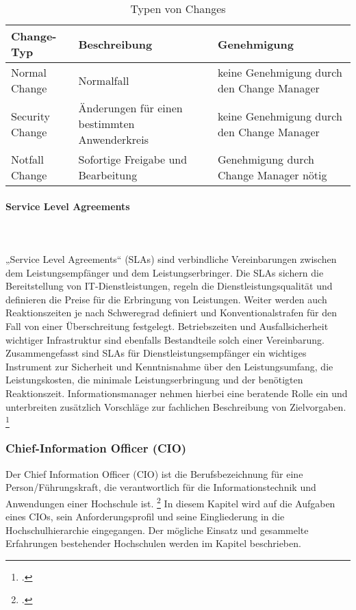 \begin{table}[h!]
	\begin{tabularx}{\textwidth}{|X|X|X|}
		\hline \textbf{Change-Typ} & \textbf{Beschreibung} & \textbf{Genehmigung}\\
		\hline Normal Change & Normalfall & keine Genehmigung durch den Change Manager\\ 
		\hline Security Change & Änderungen für einen bestimmten Anwenderkreis & keine Genehmigung 			durch den Change Manager\\
		\hline Notfall Change & Sofortige Freigabe und Bearbeitung & Genehmigung durch Change 				Manager nötig\\
		\hline
	\end{tabularx}
	\caption{Typen von Changes\protect \footnotemark}
	\label{tab_typen_von_changes}
\end{table}

\paragraph{Service Level Agreements}\mbox{}\\\\
„Service Level Agreements“ (SLAs) sind verbindliche Vereinbarungen zwischen dem Leistungsempfänger 
und dem Leistungserbringer. Die SLAs sichern die Bereitstellung von IT-Dienstleistungen, regeln die 
Dienstleistungsqualität und definieren die Preise für die Erbringung von Leistungen. Weiter werden auch 
Reaktionszeiten je nach Schweregrad definiert und Konventionalstrafen für den Fall von einer 
Überschreitung festgelegt. Betriebszeiten und Ausfallsicherheit wichtiger Infrastruktur sind ebenfalls 
Bestandteile solch einer Vereinbarung.
Zusammengefasst sind SLAs für Dienstleistungsempfänger ein wichtiges Instrument zur Sicherheit und 
Kenntnisnahme über den Leistungsumfang, die Leistungskosten, die minimale Leistungserbringung 
und der benötigten Reaktionszeit. Informationsmanager nehmen hierbei eine beratende Rolle ein und 
unterbreiten zusätzlich Vorschläge zur fachlichen Beschreibung von Zielvorgaben. 
\footcite[Vgl.][499]{heinrich_stelzer_2011}


\subsubsection{Chief-Information Officer (CIO)}
\label{subsubsection_cio}
Der Chief Information Officer (CIO) ist die Berufsbezeichnung für eine Person/Führungskraft, die 
verantwortlich für die Informationstechnik und Anwendungen einer Hochschule ist. 
\footcite[Vgl.][]{beuschel_2009} In diesem Kapitel wird auf die Aufgaben eines CIOs, sein Anforderungsprofil und seine Eingliederung in die Hochschulhierarchie eingegangen. Der mögliche Einsatz und gesammelte Erfahrungen bestehender Hochschulen werden im Kapitel \label{subsection_cio_konzept} beschrieben.


